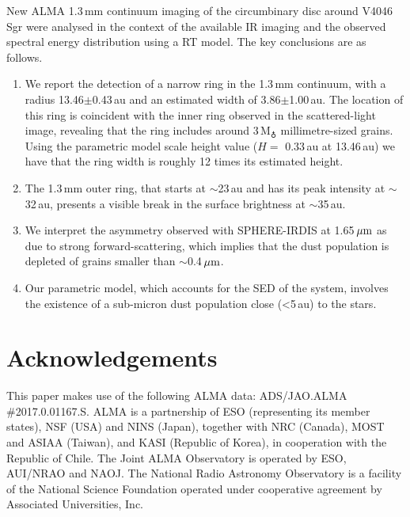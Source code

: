 \documentclass[letters,usenatbib,times]{mnras}
\begin{document}
New ALMA 1.3\,mm continuum imaging of the circumbinary disc around V4046\,Sgr were analysed in the context of the available IR imaging and the observed spectral energy distribution using a RT model. The key conclusions are as follows.
\begin{enumerate}
  \item We report the detection of a narrow ring in the 1.3\,mm continuum, with a radius 13.46$\pm$0.43\,au and an estimated width of 3.86$\pm$1.00\,au. The location of this ring is coincident with the inner ring observed in the scattered-light image, revealing that the ring includes around 3\,M$_{\earth}$ millimetre-sized grains. Using the parametric model scale height value ($H= $ 0.33\,au at 13.46\,au) we have that the ring width is roughly 12 times its estimated height.
  
  \item The 1.3\,mm outer ring, that starts at $\sim$23\,au and has its peak intensity at $\sim$32\,au, presents a visible break in the surface brightness at $\sim$35\,au. 
  
  \item We interpret the asymmetry observed with SPHERE-IRDIS at 1.65\,$\hbox{$\mu$m}$ as due to strong forward-scattering, which implies that the dust population is depleted of grains smaller than $\sim$0.4\,$\hbox{$\mu$m}$.
  
  \item Our parametric model, which accounts for the SED of the system, involves the existence of a sub-micron dust population close (<5\,au) to the stars. 
\end{enumerate}



 \section*{Acknowledgements}

This paper makes use of the following ALMA data: ADS/JAO.ALMA \#2017.0.01167.S. ALMA is a partnership of ESO (representing its member states), NSF (USA) and NINS (Japan), together with NRC (Canada), MOST and ASIAA (Taiwan), and KASI (Republic of Korea), in cooperation with the Republic of Chile. The Joint ALMA Observatory is operated by ESO, AUI/NRAO and NAOJ. The National Radio Astronomy Observatory is a facility of the National Science Foundation operated under cooperative agreement by Associated Universities, Inc.
 
\end{document}
